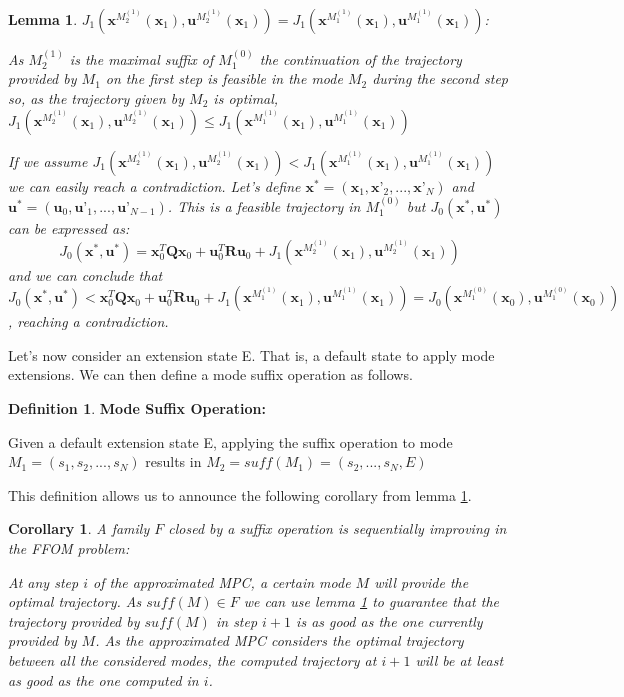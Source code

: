 \documentclass[12,twoside]{TFG-GM}
\newtheorem{lemma}[theorem]{Lemma}
\newtheorem{corollary}[theorem]{Corollary}
\theoremstyle{definition}
\newtheorem{definition}[theorem]{Definition}
\theoremstyle{remark}
\begin{document}
\begin{lemma} \label{lem:seq_imp} {$J_1(\textbf{x}^{M_2^{(1)}}(\textbf{x}_1),\textbf{u}^{M_2^{(1)}}(\textbf{x}_1)) = J_1(\textbf{x}^{M_1^{(1)}}(\textbf{x}_1),\textbf{u}^{M_1^{(1)}}(\textbf{x}_1))$:}


As $M_2^{(1)}$ is the maximal suffix of $M_1^{(0)}$ the continuation of the trajectory provided by $M_1$ on the first step is feasible in the mode $M_2$ during the second step so, as the trajectory given by $M_2$ is optimal, $J_1(\textbf{x}^{M_2^{(1)}}(\textbf{x}_1),\textbf{u}^{M_2^{(1)}}(\textbf{x}_1)) \leq J_1(\textbf{x}^{M_1^{(1)}}(\textbf{x}_1),\textbf{u}^{M_1^{(1)}}(\textbf{x}_1))$

If we assume $J_1(\textbf{x}^{M_2^{(1)}}(\textbf{x}_1),\textbf{u}^{M_2^{(1)}}(\textbf{x}_1)) < J_1(\textbf{x}^{M_1^{(1)}}(\textbf{x}_1),\textbf{u}^{M_1^{(1)}}(\textbf{x}_1))$ we can easily reach a contradiction. Let's define $\textbf{x}^* = (\textbf{x}_1, \textbf{x'}_2, ..., \textbf{x'}_N)$ and $\textbf{u}^* = (\textbf{u}_0, \textbf{u'}_1, ..., \textbf{u'}_{N-1} )$. This is a feasible trajectory in $M_1^{(0)}$ but $J_0(\textbf{x}^*, \textbf{u}^*)$ can be expressed as: $$J_0(\textbf{x}^*, \textbf{u}^*) = \textbf{x}_0^T \textbf{Q} \textbf{x}_0 + \textbf{u}_0^T \textbf{R} \textbf{u}_0 + J_1(\textbf{x}^{M_2^{(1)}}(\textbf{x}_1),\textbf{u}^{M_2^{(1)}}(\textbf{x}_1))$$ and we can conclude that $J_0(\textbf{x}^*, \textbf{u}^*) < \textbf{x}_0^T \textbf{Q} \textbf{x}_0 + \textbf{u}_0^T \textbf{R} \textbf{u}_0 + J_1(\textbf{x}^{M_1^{(1)}}(\textbf{x}_1),\textbf{u}^{M_1^{(1)}}(\textbf{x}_1)) = J_0(\textbf{x}^{M_1^{(0)}}(\textbf{x}_0),\textbf{u}^{M_1^{(0)}}(\textbf{x}_0))$, reaching a contradiction.
\end{lemma}

Let's now consider an extension state E. That is, a default state to apply mode extensions. We can then define a mode suffix operation as follows.

\begin{definition} {\textbf{Mode Suffix Operation:}}

Given a default extension state E, applying the suffix operation to mode $M_1 = (s_1, s_2, ..., s_N)$ results in $M_2 = suff(M_1) = (s_2, ..., s_N, E)$
\end{definition}

This definition allows us to announce the following corollary from lemma \ref{lem:seq_imp}.

\begin{corollary} \label{cor:seq_imp} {A family $F$ closed by a suffix operation is sequentially improving in the FFOM problem:}

At any step $i$ of the approximated MPC, a certain mode $M$ will provide the optimal trajectory. As $suff(M) \in F$ we can use lemma \ref{lem:seq_imp} to guarantee that the trajectory provided by $suff(M)$ in step $i + 1$ is as good as the one currently provided by $M$. As the approximated MPC considers the optimal trajectory between all the considered modes, the computed trajectory at $i + 1$ will be at least as good as the one computed in $i$.
\end{corollary}
\end{document}
